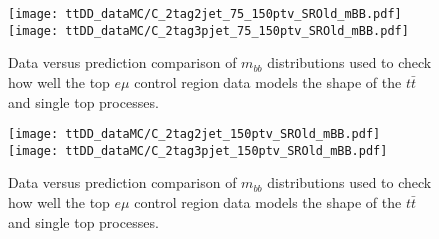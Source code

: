 \begin{figure}[h]
	\centering
  \texttt{[image: ttDD\_dataMC/C\_2tag2jet\_75\_150ptv\_SROld\_mBB.pdf]}\\
  \texttt{[image: ttDD\_dataMC/C\_2tag3pjet\_75\_150ptv\_SROld\_mBB.pdf]}\\
	\caption{Data versus prediction comparison of $m_{bb}$ distributions used to
    check how well the top $e\mu$ control region data models the shape of the
    $t\bar{t}$ and single top processes.}
	\label{fig:ttbardd-mbb}
\end{figure}
\begin{figure}[h]
  \ContinuedFloat
	\centering
  \texttt{[image: ttDD\_dataMC/C\_2tag2jet\_150ptv\_SROld\_mBB.pdf]}\\
  \texttt{[image: ttDD\_dataMC/C\_2tag3pjet\_150ptv\_SROld\_mBB.pdf]}
	\caption{Data versus prediction comparison of $m_{bb}$ distributions used to
    check how well the top $e\mu$ control region data models the shape of the
    $t\bar{t}$ and single top processes.}
	\label{fig:ttbardd-mbb}
\end{figure}